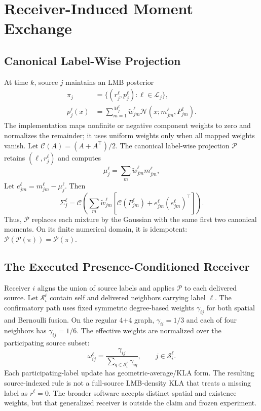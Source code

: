\section{Receiver-Induced Moment Exchange}
\label{sec:method}

\subsection{Canonical Label-Wise Projection}

At time $k$, source $j$ maintains an LMB posterior
\begin{equation}
\begin{split}
    \pi_j &= \{(r_j^\ell,p_j^\ell):\ell\in\mathcal L_j\},\\
    p_j^\ell(x)&=\sum_{m=1}^{M_j^\ell}\widetilde w_{jm}^\ell
    \mathcal N(x;m_{jm}^\ell,P_{jm}^\ell).
\end{split}
    \label{eq:lmb-gm}
\end{equation}
The implementation maps nonfinite or negative component weights to zero and
normalizes the remainder; it uses uniform weights only when all mapped weights
vanish. Let $\mathcal C(A)=(A+A^\top)/2$. The canonical label-wise projection
$\mathcal P$ retains $(\ell,r_j^\ell)$ and computes
\begin{equation}
 \mu_j^\ell=\sum_m\widetilde w_{jm}^\ell m_{jm}^\ell,
 \label{eq:projection}
\end{equation}
Let $e_{jm}^\ell=m_{jm}^\ell-\mu_j^\ell$. Then
\begin{equation}
 \Sigma_j^\ell=\mathcal C\!\left(\sum_m\widetilde w_{jm}^\ell
 \left[\mathcal C(P_{jm}^\ell)+
 e_{jm}^\ell(e_{jm}^\ell)^\top\right]\right).
 \label{eq:covariance}
\end{equation}
Thus, $\mathcal P$ replaces each mixture by the Gaussian with the same first
two canonical moments. On its finite numerical domain, it is idempotent:
$\mathcal P(\mathcal P(\pi))=\mathcal P(\pi)$.

\subsection{The Executed Presence-Conditioned Receiver}

Receiver $i$ aligns the union of source labels and applies $\mathcal P$ to each
delivered source. Let $\mathcal S_i^\ell$ contain self and delivered neighbors
carrying label $\ell$. The confirmatory path uses fixed symmetric degree-based
weights $\gamma_{ij}$ for both spatial and Bernoulli fusion. On the regular 4+4
graph, $\gamma_{ii}=1/3$ and each of four neighbors has $\gamma_{ij}=1/6$.
The effective weights are normalized over the participating source subset:
\begin{equation}
 \omega_{ij}^\ell=\frac{\gamma_{ij}}
 {\sum_{q\in\mathcal S_i^\ell}\gamma_{iq}},
 \qquad j\in\mathcal S_i^\ell.
 \label{eq:active-weights}
\end{equation}
Each participating-label update has geometric-average/KLA form. The resulting
source-indexed rule is not a full-source LMB-density KLA that treats a missing
label as $r^\ell=0$. The broader software accepts distinct spatial and existence
weights, but that generalized receiver is outside the claim and frozen experiment.

